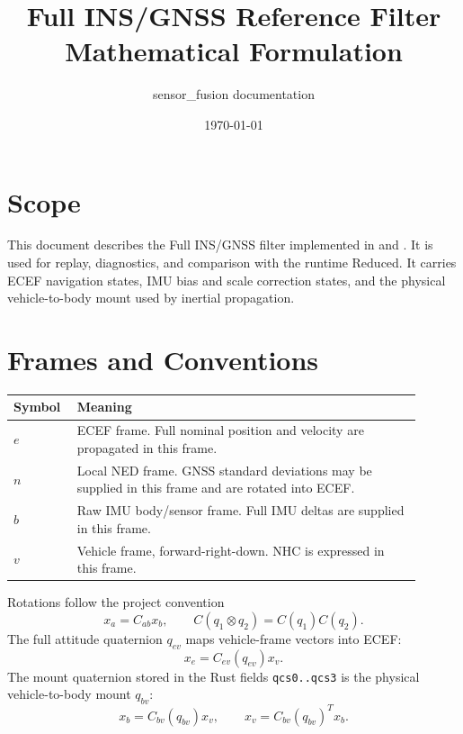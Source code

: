 \documentclass[11pt]{article}
\title{Full INS/GNSS Reference Filter Mathematical Formulation}
\author{sensor\_fusion documentation}
\date{\today}
\newcommand{\T}{^{T}}
\begin{document}
\maketitle
\tableofcontents
\newpage

\section{Scope}

This document describes the Full INS/GNSS filter implemented in
 and . It is used
for replay, diagnostics, and comparison with the runtime Reduced. It carries
ECEF navigation states, IMU bias and scale correction states, and the physical
vehicle-to-body mount used by inertial propagation.

\section{Frames and Conventions}

\begin{longtable}{>{\raggedright\arraybackslash}p{0.12\linewidth} >{\raggedright\arraybackslash}p{0.78\linewidth}}
\toprule
\textbf{Symbol} & \textbf{Meaning} \\
\midrule
\(e\) & ECEF frame. Full nominal position and velocity are propagated in this frame. \\
\(n\) & Local NED frame. GNSS standard deviations may be supplied in this frame and are rotated into ECEF. \\
\(b\) & Raw IMU body/sensor frame. Full IMU deltas are supplied in this frame. \\
\(v\) & Vehicle frame, forward-right-down. NHC is expressed in this frame. \\
\bottomrule
\end{longtable}

Rotations follow the project convention
\begin{equation}
  x_a=C_{ab}x_b,\qquad C(q_1\otimes q_2)=C(q_1)C(q_2).
\end{equation}
The full attitude quaternion \(q_{ev}\) maps vehicle-frame vectors into ECEF:
\begin{equation}
  x_e=C_{ev}(q_{ev})x_v .
\end{equation}
The mount quaternion stored in the Rust fields \texttt{qcs0..qcs3} is the
physical vehicle-to-body mount \(q_{bv}\):
\begin{equation}
  x_b=C_{bv}(q_{bv})x_v,\qquad x_v=C_{bv}(q_{bv})\T x_b .
\end{equation}
\end{document}

